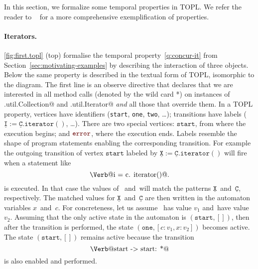 \documentclass[9pt, preprint]{sigplanconf} %
\makeatletter
\newcommand{\error}{\ensuremath{\textcolor{darkred}{\mathtt{error}}}\xspace}
\newcommand{\pattern}[1]{\ensuremath{\mathtt{\underline{#1}}}}
\newcommand{\start}{\ensuremath{\mathtt{start}}\xspace}
\newcommand{\verbline}[2][]{\[\text{\Verb@#2@}#1\]}
\theoremstyle{definition}
\theoremstyle{remark}
\makeatother
\begin{document}
In this section, we formalize some temporal properties in TOPL. We refer the reader to ~\cite{our-fool2011} for a more comprehensive
exemplification of properties.

\paragraph{Iterators.} 
\autoref{fig:first.topl} (top)  formalise the temporal property~\eqref{q:concur-it} from Section~\ref{sec:motivating-examples}
by describing the interaction of three objects.
Below the same property is described in the textual form of TOPL, isomorphic to the diagram.
The first line is an observe directive that declares that we are
interested in all method calls (denoted by the wild card *) on
instances of \Verb@java.util.Collection@ and \Verb@java.util.Iterator@ \emph{and} all those that override them.
%
In a TOPL property, vertices have identifiers (\texttt{start}, \texttt{one}, \texttt{two}, \dots);
transitions have labels ($\pattern I:=\pattern C.\mathtt{iterator}()$, \dots).
There are two special vertices: \start, from where the execution begins; and \error, where the execution ends.
Labels resemble the shape of program statements enabling the corresponding transition.
For example the outgoing transition of vertex \start labeled by $\pattern X:=\pattern{C}.\mathtt{iterator}()$ 
will fire when a statement like \verbline[.]{i = c.\PY{n+na}{iterator}()} is executed.
In that case the values of \Verb@i@~and~\Verb@c@ will match the patterns \pattern X~and~\pattern C, respectively.
The matched values for \pattern X~and~\pattern C are then written in the automaton variables $x$~and~$c$.
For concreteness, let us assume   \Verb@i@~has value $v_1$ and~\Verb@c@ have value $v_2$. 
Assuming that the only active state in the automaton is $(\start,[])$, then 
after the transition is performed, the state $(\mathtt{one},[c:v_1,x:v_2])$ becomes active.
The state $(\start,[])$ remains active because the transition \verbline{start -> start: *} is also enabled and performed.
\end{document}
